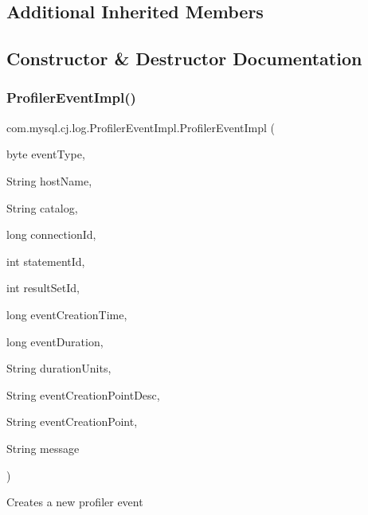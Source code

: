 \subsection*{Additional Inherited Members}


\subsection{Constructor \& Destructor Documentation}
\mbox{\label{classcom_1_1mysql_1_1cj_1_1log_1_1_profiler_event_impl_a2de358527d7de9c58f280d4843974a2a}} 
\subsubsection{\texorpdfstring{Profiler\+Event\+Impl()}{ProfilerEventImpl()}}
{\footnotesize\ttfamily com.\+mysql.\+cj.\+log.\+Profiler\+Event\+Impl.\+Profiler\+Event\+Impl (\begin{DoxyParamCaption}\item[{byte}]{event\+Type,  }\item[{String}]{host\+Name,  }\item[{String}]{catalog,  }\item[{long}]{connection\+Id,  }\item[{int}]{statement\+Id,  }\item[{int}]{result\+Set\+Id,  }\item[{long}]{event\+Creation\+Time,  }\item[{long}]{event\+Duration,  }\item[{String}]{duration\+Units,  }\item[{String}]{event\+Creation\+Point\+Desc,  }\item[{String}]{event\+Creation\+Point,  }\item[{String}]{message }\end{DoxyParamCaption})}

Creates a new profiler event


